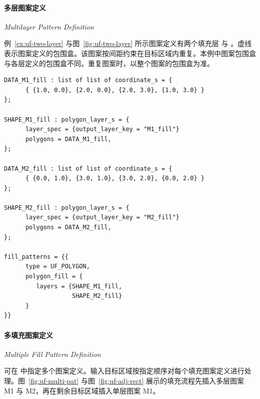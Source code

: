 
\paragraph{多层图案定义}
\textit{Multilayer Pattern Definition}

例~\ref{ex:uf-two-layer} 与图~\ref{fig:uf-two-layer} 所示图案定义有两个填充层  与 。虚线表示图案定义的包围盒。该图案按间距约束在目标区域内重复。本例中图案包围盒与各层定义的包围盒不同。重复图案时，以整个图案的包围盒为准。

\begin{lstlisting}[style=pxl,caption={使用 UF\_POLYGON 类型的两填充层示例},label={ex:uf-two-layer}]
DATA_M1_fill : list of list of coordinate_s = {
      { {1.0, 0.0}, {2.0, 0.0}, {2.0, 3.0}, {1.0, 3.0} }
};

SHAPE_M1_fill : polygon_layer_s = {
      layer_spec = {output_layer_key = "M1_fill"}
      polygons = DATA_M1_fill,
};

DATA_M2_fill : list of list of coordinate_s = {
      { {0.0, 1.0}, {3.0, 1.0}, {3.0, 2.0}, {0.0, 2.0} }
};

SHAPE_M2_fill : polygon_layer_s = {
      layer_spec = {output_layer_key = "M2_fill"}
      polygons = DATA_M2_fill,
};

fill_patterns = {{
      type = UF_POLYGON,
      polygon_fill = {
         layers = {SHAPE_M1_fill,
                   SHAPE_M2_fill}
      }
}}
\end{lstlisting}


\paragraph{多填充图案定义}
\textit{Multiple Fill Pattern Definition}

可在  中指定多个图案定义。输入目标区域按指定顺序对每个填充图案定义进行处理。图~\ref{fig:uf-multi-pat} 与图~\ref{fig:uf-adj-rect} 展示的填充流程先插入多层图案 M1 与 M2，再在剩余目标区域插入单层图案 M1。

